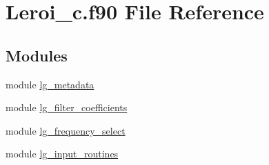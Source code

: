 \hypertarget{Leroi__c_8f90}{}\section{Leroi\+\_\+c.\+f90 File Reference}
\label{Leroi__c_8f90}
\subsection*{Modules}
\begin{DoxyCompactItemize}
\item 
module \hyperlink{namespacelg__metadata}{lg\+\_\+metadata}
\item 
module \hyperlink{namespacelg__filter__coefficients}{lg\+\_\+filter\+\_\+coefficients}
\item 
module \hyperlink{namespacelg__frequency__select}{lg\+\_\+frequency\+\_\+select}
\item 
module \hyperlink{namespacelg__input__routines}{lg\+\_\+input\+\_\+routines}
\end{DoxyCompactItemize}
